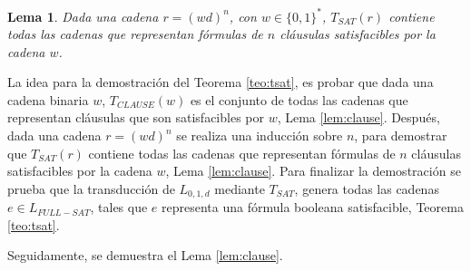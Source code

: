 \documentclass[12pt]{article}
\newtheorem{lemma}{Lema}
\begin{document}
\begin{lemma}
    \label{lem:sat}
    Dada una cadena $r=(wd)^n$, con $w\in\{0,1\}^*$, $T_{SAT}(r)$ contiene todas las cadenas que representan fórmulas de $n$ cláusulas satisfacibles por la cadena $w$.
\end{lemma}

La idea para la demostración del Teorema \ref{teo:tsat}, es probar que dada una cadena binaria $w$, $T_{CLAUSE}(w)$ es el conjunto de todas las cadenas que representan cláusulas que son satisfacibles por $w$, Lema \ref{lem:clause}.
Después, dada una cadena $r=(wd)^n$ se realiza una inducción sobre  $n$, para demostrar que $T_{SAT}(r)$ contiene todas las cadenas que representan fórmulas de $n$ cláusulas satisfacibles por la cadena $w$, Lema \ref{lem:clause}.
Para finalizar la demostración se prueba que la transducción de $L_{0,1,d}$ mediante $T_{SAT}$, genera todas las cadenas
$e\in L_{FULL-SAT}$, tales que $e$ representa una fórmula booleana satisfacible, Teorema \ref{teo:tsat}.

Seguidamente, se demuestra el Lema \ref{lem:clause}.
\end{document}

